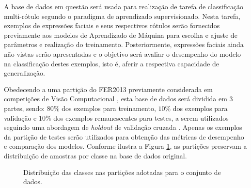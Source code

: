 A base de dados em questão será usada para realização de tarefa de classificação multi-rótulo segundo o paradigma de aprendizado supervisionado. Nesta tarefa, exemplos de expressões faciais e seus respectivos rótulos serão fornecidos previamente aos modelos de Aprendizado de Máquina para escolha e ajuste de parâmetros e realização do treinamento. Posteriormente, expressões faciais ainda não vistas serão apresentadas e o objetivo será avaliar o desempenho do modelo na classificação destes exemplos, isto é, aferir a respectiva capacidade de generalização.

Obedecendo a uma partição do FER2013 previamente considerada em competições de Visão Computacional \cite{Kaggle:FER2013}, esta base de dados será dividida em $3$ partes, sendo: $80$\% dos exemplos para treinamento,  $10$\% dos exemplos para validação e $10$\% dos exemplos remanescentes para testes, a serem utilizados seguindo uma abordagem de \emph{holdout} de validação cruzada  \cite{Brink:MachineLearningLivro}.  Apenas os exemplos da partição de testes serão utilizados para obtenção das métricas de desempenho e comparação dos modelos. Conforme ilustra a Figura \ref{fig:particoes}, as partições preservam a distribuição de amostras por classe na base de dados original.

\begin{figure}[!htb]
	\centering
  	\caption{Distribuição das classes nas partições adotadas para o conjunto de dados.} \label{fig:particoes}
\end{figure}

